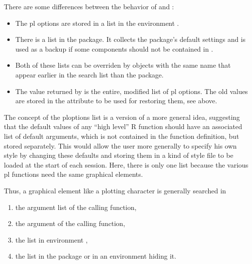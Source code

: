 \documentclass[11pt]{article}
\begin{document}
There are some differences between the behavior of  and :
\begin{itemize}
\item 
  The pl options are stored in a list  in the environment
  .
\item
  There is a list  in the package. It collects the
  package's default settings and is used as a backup if some components should
  not be contained in .
\item
  Both of these lists can be overriden by objects with the same name
  that appear earlier in the search list than the  package.
\item
  The value returned by  is the entire, modified list of 
  pl options. The old values are stored in the attribute 
  to be used for restoring them, see above.
\end{itemize}

\Remark
The concept of the ploptions list is a version of a more general idea, 
suggesting that the default values of any ``high level'' R function should 
have an associated list of default arguments, which is not contained in 
the function definition, but stored separately. 
This would allow the user more generally to specify his own style by 
changing these defaults and storing them in a kind of style file to be 
loaded at the start of each session. 
Here, there is only one list because the various pl functions need the 
same graphical elements.

Thus, a graphical element like a plotting character is generally searched 
in
\begin{enumerate}
\item 
  the argument list of the calling function,
\item
  the  argument of the calling function,
\item
  the  list in environment ,
\item
  the list  in the package 
  or in an environment hiding it.
\end{enumerate}
\end{document}
